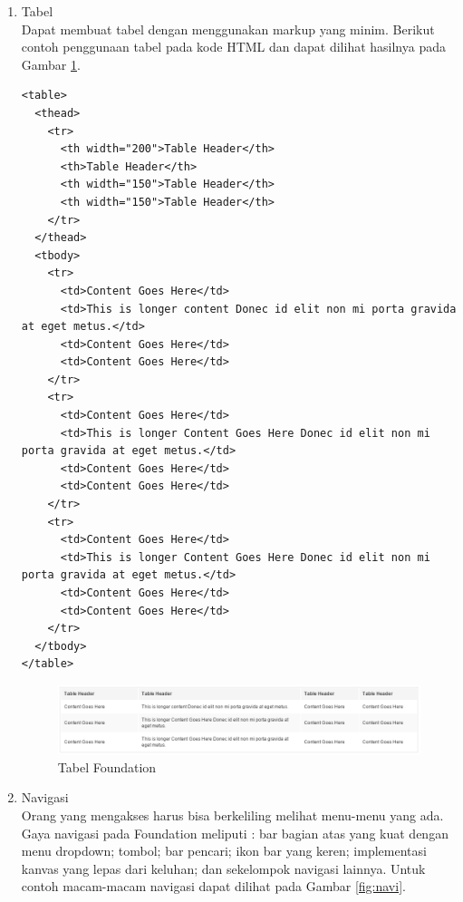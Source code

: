 \begin{itemize}
\begin{itemize}
\begin{enumerate}[(1)]
\item Tabel\\
Dapat membuat tabel dengan menggunakan markup yang minim. Berikut contoh
penggunaan tabel pada kode HTML dan dapat dilihat hasilnya pada Gambar
\ref{fig:tabel}.
\begin{lstlisting}[basicstyle=\footnotesize]
<table>
  <thead>
    <tr>
      <th width="200">Table Header</th>
      <th>Table Header</th>
      <th width="150">Table Header</th>
      <th width="150">Table Header</th>
    </tr>
  </thead>
  <tbody>
    <tr>
      <td>Content Goes Here</td>
      <td>This is longer content Donec id elit non mi porta gravida at eget metus.</td>
      <td>Content Goes Here</td>
      <td>Content Goes Here</td>
    </tr>
    <tr>
      <td>Content Goes Here</td>
      <td>This is longer Content Goes Here Donec id elit non mi porta gravida at eget metus.</td>
      <td>Content Goes Here</td>
      <td>Content Goes Here</td>
    </tr>
    <tr>
      <td>Content Goes Here</td>
      <td>This is longer Content Goes Here Donec id elit non mi porta gravida at eget metus.</td>
      <td>Content Goes Here</td>
      <td>Content Goes Here</td>
    </tr>
  </tbody>
</table>
\end{lstlisting}
\begin{figure}[H]
\centering
\includegraphics[scale=0.6]{Gambar/tabel.png}
\caption[Tabel Foundation]{Tabel Foundation}
\label{fig:tabel}
\end{figure}
\item Navigasi\\
Orang yang mengakses harus bisa berkeliling melihat menu-menu yang ada. Gaya
navigasi pada Foundation meliputi : bar bagian atas yang kuat dengan menu
dropdown; tombol; bar pencari; ikon bar yang keren; implementasi kanvas yang
lepas dari keluhan; dan sekelompok navigasi lainnya. Untuk contoh macam-macam
navigasi dapat dilihat pada Gambar \ref{fig:navi}.
\begin{figure}[H]
\centering

\end{figure}
\end{enumerate}
\end{itemize}
\end{itemize}

